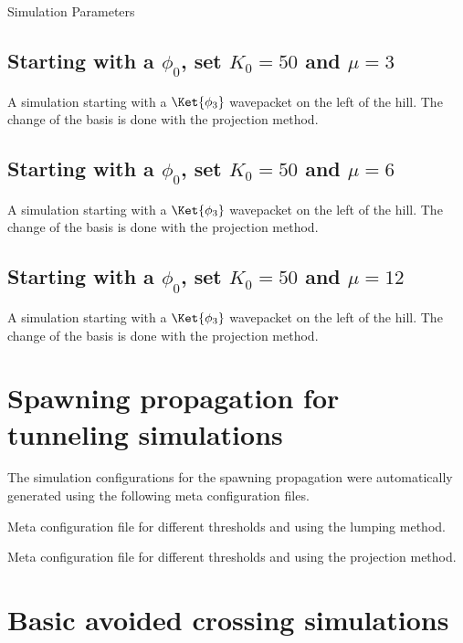 \begin{chapter}{Simulation Parameters}
\subsection{Starting with a $\phi_0$, set $K_0=50$ and $\mu=3$}
\label{cfg:eckart_phi0_mu3}
A simulation starting with a $\Ket{\phi_3}$ wavepacket on the left of the hill.
The change of the basis is done with the projection method.

\subsection{Starting with a $\phi_0$, set $K_0=50$ and $\mu=6$}
\label{cfg:eckart_phi0_mu6}
A simulation starting with a $\Ket{\phi_3}$ wavepacket on the left of the hill.
The change of the basis is done with the projection method.

\subsection{Starting with a $\phi_0$, set $K_0=50$ and $\mu=12$}
\label{cfg:eckart_phi0_mu12}
A simulation starting with a $\Ket{\phi_3}$ wavepacket on the left of the hill.
The change of the basis is done with the projection method.


\FloatBarrier
\section{Spawning propagation for tunneling simulations}
\label{cfg:eckart_propag}

The simulation configurations for the spawning propagation were automatically
generated using the following meta configuration files.

Meta configuration file for different thresholds and using the lumping method.

Meta configuration file for different thresholds and using the projection method.


\FloatBarrier
\section{Basic avoided crossing simulations}


\end{chapter}
